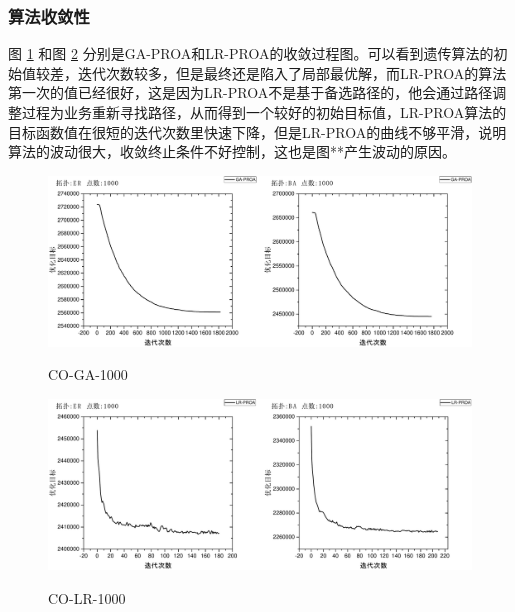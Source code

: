 \subsubsection{算法收敛性}
图 \ref{CO-GA-1000} 和图 \ref{CO-LR-1000} 分别是GA-PROA和LR-PROA的收敛过程图。可以看到遗传算法的初始值较差，迭代次数较多，但是最终还是陷入了局部最优解，而LR-PROA的算法第一次的值已经很好，这是因为LR-PROA不是基于备选路径的，他会通过路径调整过程为业务重新寻找路径，从而得到一个较好的初始目标值，LR-PROA算法的目标函数值在很短的迭代次数里快速下降，但是LR-PROA的曲线不够平滑，说明算法的波动很大，收敛终止条件不好控制，这也是图**产生波动的原因。
\begin{figure}
\setlength{\belowcaptionskip}{-0.1cm}
  \begin{center}
    {\includegraphics[width=1 \textwidth]{figures/CO-GA-1000.pdf}}
    \end{center}
  \caption{{\footnotesize{CO-GA-1000}}}
  \label{CO-GA-1000}
\end{figure}
\begin{figure}
\setlength{\belowcaptionskip}{-0.1cm}
  \begin{center}
    {\includegraphics[width=1 \textwidth]{figures/CO-LR-1000.pdf}}
    \end{center}
  \caption{{\footnotesize{CO-LR-1000}}}
  \label{CO-LR-1000}
\end{figure}






